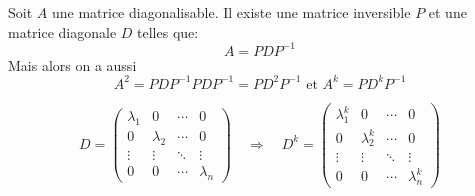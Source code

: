
Soit $A$ une matrice diagonalisable. Il existe une matrice inversible $P$ et une matrice diagonale $D$ telles que:
\[A = PDP^{-1}\]
Mais alors on a aussi 
\[A^2 = PDP^{-1}PDP^{-1} = PD^2P^{-1} \text{ et } A^k = PD^kP^{-1}\]


\[
D =
\begin{pmatrix}
\lambda_1 & 0 & \cdots & 0 \\
0 & \lambda_2 & \cdots & 0 \\
\vdots & \vdots & \ddots & \vdots \\
0 & 0 & \cdots & \lambda_n
\end{pmatrix}
\quad \Rightarrow \quad
D^k =
\begin{pmatrix}
\lambda_1^k & 0 & \cdots & 0 \\
0 & \lambda_2^k & \cdots & 0 \\
\vdots & \vdots & \ddots & \vdots \\
0 & 0 & \cdots & \lambda_n^k
\end{pmatrix}
\]

